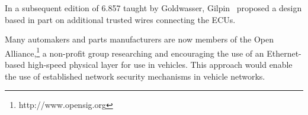 In a subsequent edition of 6.857 taught by Goldwasser, Gilpin~\cite{Gilpin2016} proposed 
a design based in part on additional trusted wires connecting the ECUs.


Many automakers and parts manufacturers are now members of the 
Open Alliance,\footnote{http://www.opensig.org}
a non-profit group researching and encouraging the use of an Ethernet-based high-speed physical layer 
for use in vehicles.  This approach would enable the use of 
established network security mechanisms in vehicle networks.


